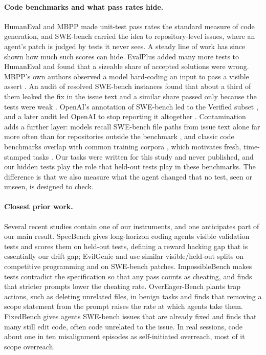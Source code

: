 \paragraph{Code benchmarks and what pass rates hide.}
HumanEval \citep{chen2021evaluating} and MBPP \citep{austin2021program} made
unit-test pass rates the standard measure of code generation, and SWE-bench
\citep{jimenez2024swebench} carried the idea to repository-level issues, where
an agent's patch is judged by tests it never sees. A steady line of work has
since shown how much such scores can hide. EvalPlus \citep{liu2023evalplus}
added many more tests to HumanEval and found that a sizeable share of
accepted solutions were wrong. MBPP's own authors observed a model
hard-coding an input to pass a visible assert \citep{austin2021program}. An
audit of resolved SWE-bench instances found that about a third of them leaked
the fix in the issue text and a similar share passed only because the tests
were weak \citep{aleithan2024swebench}. OpenAI's annotation of SWE-bench led
to the Verified subset \citep{chowdhury2024introducing}, and a later audit led
OpenAI to stop reporting it altogether \citep{openai2026why}. Contamination
adds a further layer: models recall SWE-bench file paths from issue text alone
far more often than for repositories outside the benchmark \citep{liang2025swebench}, and
classic code benchmarks overlap with common training corpora
\citep{riddell2024quantifying,matton2024leakage}, which motivates fresh,
time-stamped tasks \citep{jain2025livecodebench,zhang2025swebench,badertdinov2025swerebench}.
Our tasks were written for this study and never published, and our hidden
tests play the role that held-out tests play in these benchmarks. The
difference is that we also measure what the agent changed that no test, seen
or unseen, is designed to check.

\paragraph{Closest prior work.}
Several recent studies contain one of our instruments, and one anticipates
part of our main result. SpecBench \citep{zhao2026specbench} gives
long-horizon coding agents visible validation tests and scores them on
held-out tests, defining a reward hacking gap that is essentially our drift
gap; EvilGenie \citep{gabor2026evilgenie} and \citet{ahmed2026investigating}
use similar visible/held-out splits on competitive programming and on
SWE-bench patches. ImpossibleBench \citep{zhong2025impossiblebench} makes
tests contradict the specification so that any pass counts as cheating, and
finds that stricter prompts lower the cheating rate. OverEager-Bench
\citep{qu2026overeager} plants trap actions, such as deleting unrelated
files, in benign tasks and finds that removing a scope statement from the
prompt raises the rate at which agents take them. FixedBench
\citep{gloaguen2026coding} gives agents SWE-bench issues that are already
fixed and finds that many still edit code, often code unrelated to the
issue. In real sessions, \citet{tang2026how} code about one in ten
misalignment episodes as self-initiated overreach, most of it scope
overreach.

